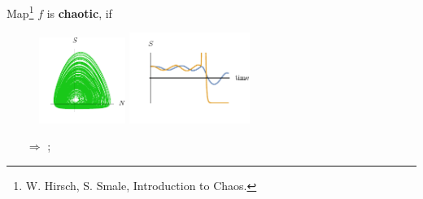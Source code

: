 
  Map\footnote{
    W. Hirsch, S. Smale, Introduction to Chaos.
} $f$ is \textbf{chaotic}, if \\
\begin{itemize}
\end{itemize}

\vspace{-5mm}
\begin{figure}[h]
    \centering
    \includegraphics[width=0.25\textwidth]{figures/attractor.pdf}
    \hspace{5 mm}
    \includegraphics[width=0.35\textwidth]{figures/ics.pdf}
\end{figure}

\vspace{-5mm}
\begin{itemize}
    \item[$\Rightarrow$] ;
\end{itemize}